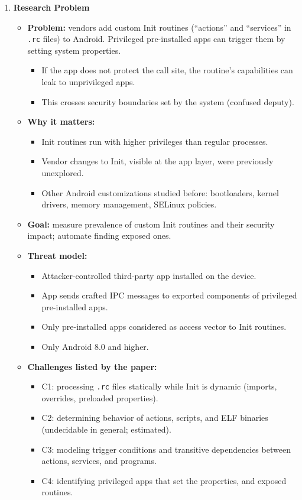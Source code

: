 \documentclass[11pt,a4paper]{article}
\newcommand{\entrypart}[1]{\textbf{\color{accent}#1}\par\vspace{2pt}}
\begin{document}
\begin{enumerate}
    \item \entrypart{Research Problem}
    \begin{itemize}[leftmargin=*, itemsep=1pt, topsep=2pt]
        \item \textbf{Problem:} vendors add custom Init routines (``actions'' and ``services'' in \texttt{.rc} files) to Android. Privileged pre-installed apps can trigger them by setting system properties.
        \begin{itemize}[itemsep=0pt]
            \item If the app does not protect the call site, the routine's capabilities can leak to unprivileged apps.
            \item This crosses security boundaries set by the system (confused deputy).
        \end{itemize}
        \item \textbf{Why it matters:}
        \begin{itemize}[itemsep=0pt]
            \item Init routines run with higher privileges than regular processes.
            \item Vendor changes to Init, visible at the app layer, were previously unexplored.
            \item Other Android customizations studied before: bootloaders, kernel drivers, memory management, SELinux policies.
        \end{itemize}
        \item \textbf{Goal:} measure prevalence of custom Init routines and their security impact; automate finding exposed ones.
        \item \textbf{Threat model:}
        \begin{itemize}[itemsep=0pt]
            \item Attacker-controlled third-party app installed on the device.
            \item App sends crafted IPC messages to exported components of privileged pre-installed apps.
            \item Only pre-installed apps considered as access vector to Init routines.
            \item Only Android 8.0 and higher.
        \end{itemize}
        \item \textbf{Challenges listed by the paper:}
        \begin{itemize}[itemsep=0pt]
            \item C1: processing \texttt{.rc} files statically while Init is dynamic (imports, overrides, preloaded properties).
            \item C2: determining behavior of actions, scripts, and ELF binaries (undecidable in general; estimated).
            \item C3: modeling trigger conditions and transitive dependencies between actions, services, and programs.
            \item C4: identifying privileged apps that set the properties, and exposed routines.
        \end{itemize}
    \end{itemize}


\end{enumerate}
\end{document}
